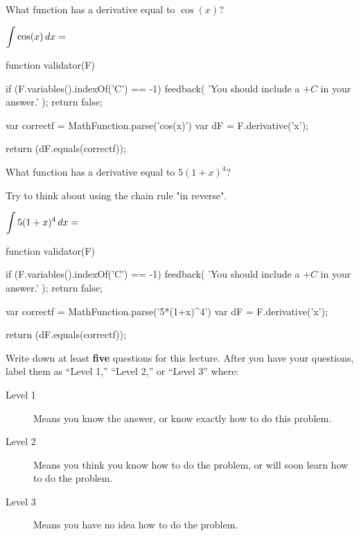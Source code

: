 \documentclass{ximera}
\begin{document}
\begin{question}
	\begin{hint}
		What function has a derivative equal to $\cos(x)$?
	\end{hint}
 	$\displaystyle \int \cos(x) \,d x = $ 
	\begin{expression-answer}
 function validator(F) {
   if (F.variables().indexOf('C') == -1) {
     feedback( 'You should include a $+C$ in your answer.' );
     return false;
   }
   
   var correctf = MathFunction.parse('cos(x)')
   var dF = F.derivative('x');
   
   return (dF.equals(correctf));
 }
\end{expression-answer}	
	
\end{question}

\begin{question}
	\begin{hint}
		What function has a derivative equal to $5(1+x)^4$?
	\end{hint}
	\begin{hint}
		Try to think about using the chain rule "in reverse".
	\end{hint}
 	$\displaystyle \int 5(1+x)^4 \,d x = $ 
	\begin{expression-answer}
 function validator(F) {
   if (F.variables().indexOf('C') == -1) {
     feedback( 'You should include a $+C$ in your answer.' );
     return false;
   }
   
   var correctf = MathFunction.parse('5*(1+x)^4')
   var dF = F.derivative('x');
   
   return (dF.equals(correctf));
 }
\end{expression-answer}	
	
\end{question}


\begin{question}
Write down at least \textbf{five} questions for this lecture. After
you have your questions, label them as ``Level 1,'' ``Level 2,'' or ``Level 3'' where:
\begin{description}
\item[Level 1] Means you know the answer, or know exactly how to do this problem.
\item[Level 2] Means you think you know how to do the problem, or will soon learn how to do the problem.
\item[Level 3] Means you have no idea how to do the problem. 
\end{description}
\begin{freeResponse}
\end{freeResponse}
\end{question}
\end{document}
